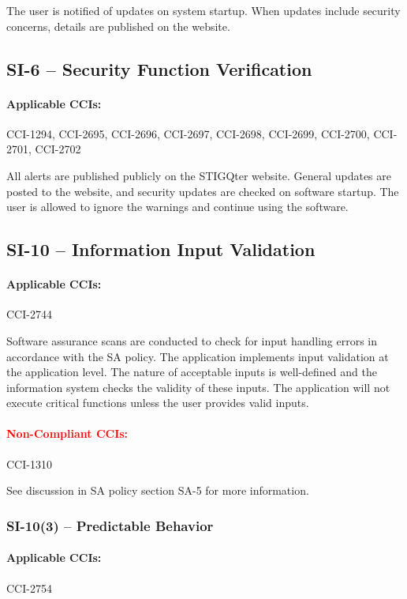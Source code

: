 \documentclass[letterpaper, 10pt, twoside]{article}
\begin{document}
The user is notified of updates on system startup. When updates include security concerns, details are published on the website.

\subsection{SI-6 -- Security Function Verification}

\paragraph{Applicable CCIs:} CCI-1294, CCI-2695, CCI-2696, CCI-2697, CCI-2698, CCI-2699, CCI-2700, CCI-2701, CCI-2702

All alerts are published publicly on the STIGQter website. General updates are posted to the website, and security updates are checked on software startup. The user is allowed to ignore the warnings and continue using the software.

\subsection{SI-10 -- Information Input Validation}

\paragraph{Applicable CCIs:} CCI-2744

Software assurance scans are conducted to check for input handling errors in accordance with the SA policy. The application implements input validation at the application level. The nature of acceptable inputs is well-defined and the information system checks the validity of these inputs. The application will not execute critical functions unless the user provides valid inputs.

\paragraph{\textcolor{red}{Non-Compliant CCIs:}} CCI-1310

See discussion in SA policy section SA-5 for more information.

\subsubsection{SI-10(3) -- Predictable Behavior}

\paragraph{Applicable CCIs:} CCI-2754
\end{document}
